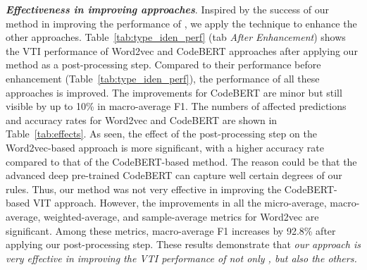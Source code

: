 \textbf{\textit{Effectiveness in improving approaches}}. Inspired by the success of our method in improving the performance of \base, we apply the technique to enhance the other approaches. 
%
Table~\ref{tab:type_iden_perf} (tab \textit{After Enhancement}) shows the VTI performance of Word2vec and CodeBERT approaches after applying our method as a post-processing step. 
Compared to their performance before enhancement (Table~\ref{tab:type_iden_perf}), the performance of all these approaches is improved. The improvements for CodeBERT are minor but still visible by up to 10\% in macro-average F1. 
%
The numbers of affected predictions and accuracy rates for Word2vec and CodeBERT are shown in Table~\ref{tab:effects}. As seen, the effect of the post-processing step on the Word2vec-based approach is more significant, with a higher accuracy rate compared to that of the CodeBERT-based method.
%
The reason could be that the advanced deep pre-trained CodeBERT can capture well certain degrees of our rules. Thus, our method was not very effective in improving the CodeBERT-based VIT approach. 
%
However, the improvements in all the micro-average, macro-average, weighted-average, and sample-average metrics for Word2vec are significant. Among these metrics, macro-average F1 increases by 92.8\% after applying our post-processing step. These results demonstrate that \textit{our approach is very effective in improving the VTI performance of not only \base, but also the others.}


\
